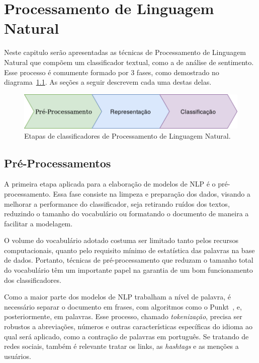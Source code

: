 \chapter{Processamento de Linguagem Natural}
\label{chapter:nlp}

Neste capitulo serão apresentadas as técnicas de Processamento de Linguagem
Natural que compõem um classificador textual, como a de análise de sentimento.
Esse processo é comumente formado por 3 fases, como demostrado no
diagrama~\ref{fig:nlp_diagram}.
As seções a seguir descrevem cada uma destas delas.

\begin{figure}[h]
\begin{center} {
    \begin{center}
    \includegraphics[scale=0.35]{images/nlp_diagram.png}
    \caption{Etapas de classificadores de Processamento de Linguagem Natural.}
    \label{fig:nlp_diagram}
    \end{center}
}
\end{center}
\end{figure}

\section{Pré-Processamentos}

A primeira etapa aplicada para a elaboração de modelos de NLP é o
pré-processamento.
Essa fase consiste na limpeza e preparação dos dados, visando a melhorar a
performance do classificador, seja retirando ruídos dos textos, reduzindo o
tamanho do vocabulário ou formatando o documento de maneira a facilitar a modelagem.

O volume do vocabulário adotado costuma ser limitado tanto pelos recursos
computacionais, quanto pelo requisito mínimo de estatística das palavras na base
de dados.
Portanto, técnicas de pré-processamento que reduzam o tamanho total do
vocabulário têm um importante papel na garantia de um bom funcionamento dos
classificadores.

Como a maior parte dos modelos de NLP trabalham a nível de palavra, é necessário
separar o documento em frases, com algoritmos como o Punkt~\cite{kiss06}, e,
posteriormente, em palavras.
Esse processo, chamado \textit{tokenização}, precisa ser robustos a abreviações,
números e outras características específicas do idioma ao qual será aplicado,
como a contração de palavras em português.
Se tratando de redes sociais, também é relevante tratar os links, as
\textit{hashtags} e as menções a usuários.


